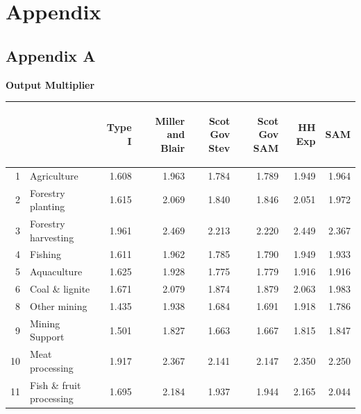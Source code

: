 \begin{doublespacing}
\end{doublespacing}

\newpage
    \section{Appendix}
\label{sec:4.7}

\subsection{Appendix A}
\label{sec:4.7.1}
\bigskip
\textbf{Output Multiplier}

\begin{longtable}{@{\extracolsep{\fill}}rlrrrrrr@{}}
  &&  \begin{sideways}Type I\end{sideways} & \begin{sideways}Miller and Blair\end{sideways} & \begin{sideways}Scot Gov Stev\end{sideways} & \begin{sideways}Scot Gov SAM\end{sideways} & \begin{sideways}HH Exp\end{sideways} & \begin{sideways}SAM\end{sideways} \\ [0.5ex] 
    \hline 
    1     & Agriculture & 1.608 & 1.963 & 1.784 & 1.789 & 1.949 & 1.964 \\
    2     & Forestry planting & 1.615 & 2.069 & 1.840 & 1.846 & 2.051 & 1.972 \\
    3     & Forestry harvesting & 1.961 & 2.469 & 2.213 & 2.220 & 2.449 & 2.367 \\
    4     & Fishing & 1.611 & 1.962 & 1.785 & 1.790 & 1.949 & 1.933 \\
    5     & Aquaculture & 1.625 & 1.928 & 1.775 & 1.779 & 1.916 & 1.916 \\
    6     & Coal \& lignite & 1.671 & 2.079 & 1.874 & 1.879 & 2.063 & 1.983 \\
    8     & Other mining & 1.435 & 1.938 & 1.684 & 1.691 & 1.918 & 1.786 \\
    9     & Mining Support & 1.501 & 1.827 & 1.663 & 1.667 & 1.815 & 1.847 \\
    10    & Meat processing & 1.917 & 2.367 & 2.141 & 2.147 & 2.350 & 2.250 \\
    11    & Fish \& fruit processing & 1.695 & 2.184 & 1.937 & 1.944 & 2.165 & 2.044 \\

\end{longtable}

